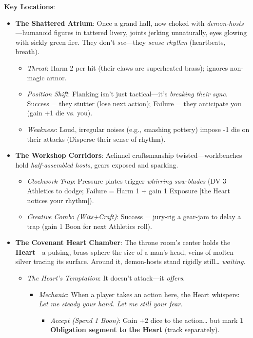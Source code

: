 \documentclass[12pt]{article}
\begin{document}
\textbf{Key Locations}:
\begin{itemize}
  \item \textbf{The Shattered Atrium}: Once a grand hall, now choked with \textit{demon-hosts}---humanoid figures in tattered livery, joints jerking unnaturally, eyes glowing with sickly green fire. They don't \textit{see}---they \textit{sense rhythm} (heartbeats, breath).
  \begin{itemize}
    \item \textit{Threat}: Harm 2 per hit (their claws are superheated brass); ignores non-magic armor.
    \item \textit{Position Shift}: Flanking isn't just tactical---it's \textit{breaking their sync}. Success = they stutter (lose next action); Failure = they anticipate you (gain +1 die vs. you).
    \item \textit{Weakness}: Loud, irregular noises (e.g., smashing pottery) impose -1 die on their attacks (Disperse their sense of rhythm).
  \end{itemize}
  \item \textbf{The Workshop Corridors}: Aelinnel craftsmanship twisted---workbenches hold \textit{half-assembled hosts}, gears exposed and sparking.
  \begin{itemize}
    \item \textit{Clockwork Trap}: Pressure plates trigger \textit{whirring saw-blades} (DV 3 Athletics to dodge; Failure = Harm 1 + gain 1 Exposure [the Heart notices your rhythm]).
    \item \textit{Creative Combo (Wits+Craft)}: Success = jury-rig a gear-jam to delay a trap (gain 1 Boon for next Athletics roll).
  \end{itemize}
  \item \textbf{The Covenant Heart Chamber}: The throne room's center holds the \textbf{Heart}---a pulsing, brass sphere the size of a man's head, veins of molten silver tracing its surface. Around it, demon-hosts stand rigidly still\ldots{} \textit{waiting}.
  \begin{itemize}
    \item \textit{The Heart's Temptation}: It doesn't attack---it \textit{offers}.
    \begin{itemize}
      \item \textit{Mechanic}: When a player takes an action here, the Heart whispers: \textit{Let me steady your hand. Let me still your fear.}
      \begin{itemize}
        \item \textit{Accept (Spend 1 Boon)}: Gain +2 dice to the action\ldots{} but mark \textbf{1 Obligation segment to the Heart} (track separately).

\end{itemize}
\end{itemize}
\end{itemize}
\end{itemize}
\end{document}
